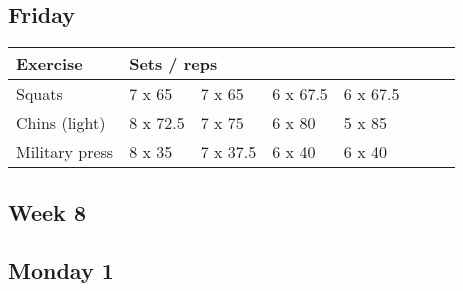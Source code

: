 \documentclass[12pt, a4paper]{article}%
\begin{document}
  \subsection*{\hspace{0.5em} Friday }


  \begin{tabular}{l|lllllll}
  \hspace{0.75em} \textbf{Exercise} & \multicolumn{ 7 }{l}{ \textbf{Sets / reps} } \\ \hline

            \hspace{0.75em} Squats
            & 7 x 65
            & 7 x 65
            & 6 x 67.5
            & 6 x 67.5
            & 
            & 
            & 
            \\


            \hspace{0.75em} Chins (light)
            & 8 x 72.5
            & 7 x 75
            & 6 x 80
            & 5 x 85
            & 
            & 
            & 
            \\


            \hspace{0.75em} Military press
            & 8 x 35
            & 7 x 37.5
            & 6 x 40
            & 6 x 40
            & 
            & 
            & 
            \\


  \end{tabular}


\clearpage \subsection*{\hspace{0.25em} Week 8 }
  \subsection*{\hspace{0.5em} Monday 1 }
\end{document}
